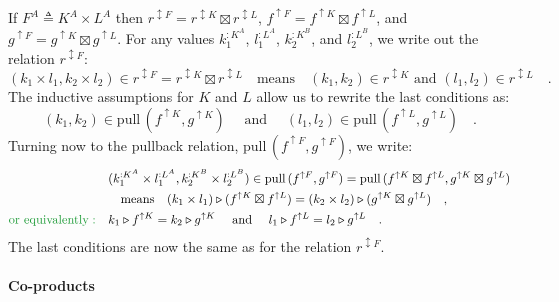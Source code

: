 If $F^{A}\triangleq K^{A}\times L^{A}$ then $r^{\updownarrow F}=r^{\updownarrow K}\boxtimes r^{\updownarrow L}$,
$f^{\uparrow F}=f^{\uparrow K}\boxtimes f^{\uparrow L}$, and $g^{\uparrow F}=g^{\uparrow K}\boxtimes g^{\uparrow L}$.
For any values $k_{1}^{:K^{A}}$, $l_{1}^{:L^{A}}$, $k_{2}^{:K^{B}}$,
and $l_{2}^{:L^{B}}$, we write out the relation $r^{\updownarrow F}$:
\[
(k_{1}\times l_{1},k_{2}\times l_{2})\in r^{\updownarrow F}=r^{\updownarrow K}\boxtimes r^{\updownarrow L}\quad\text{means}\quad(k_{1},k_{2})\in r^{\updownarrow K}\text{ and }(l_{1},l_{2})\in r^{\updownarrow L}\quad.
\]
The inductive assumptions for $K$ and $L$ allow us to rewrite the
last conditions as:
\[
(k_{1},k_{2})\in\text{pull}\,(f^{\uparrow K},g^{\uparrow K})\quad\text{ and }\quad(l_{1},l_{2})\in\text{pull}\,(f^{\uparrow L},g^{\uparrow L})\quad.
\]
Turning now to the pullback relation, $\text{pull}\,(f^{\uparrow F},g^{\uparrow F})$,
we write:
\begin{align*}
 & (k_{1}^{:K^{A}}\times l_{1}^{:L^{A}},k_{2}^{:K^{B}}\times l_{2}^{:L^{B}})\in\text{pull}\,(f^{\uparrow F},g^{\uparrow F})=\text{pull}\,(f^{\uparrow K}\boxtimes f^{\uparrow L},g^{\uparrow K}\boxtimes g^{\uparrow L})\\
 & \quad\text{means}\quad(k_{1}\times l_{1})\triangleright(f^{\uparrow K}\boxtimes f^{\uparrow L})=(k_{2}\times l_{2})\triangleright(g^{\uparrow K}\boxtimes g^{\uparrow L})\quad,\\
{\color{greenunder}\text{or equivalently}:}\quad & k_{1}\triangleright f^{\uparrow K}=k_{2}\triangleright g^{\uparrow K}\quad\text{ and }\quad l_{1}\triangleright f^{\uparrow L}=l_{2}\triangleright g^{\uparrow L}\quad.
\end{align*}
The last conditions are now the same as for the relation $r^{\updownarrow F}$.

\paragraph{Co-products}

